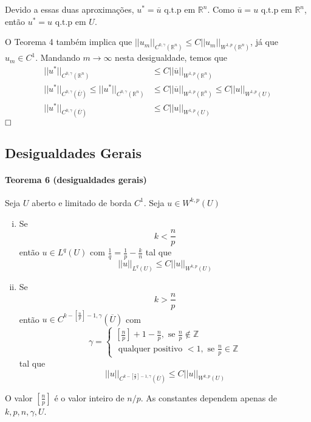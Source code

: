 \documentclass[a4paper, 11pt]{book}
\newcommand{\qed}{$\hfill\square$}
\newcommand{\Z}{\mathbb{Z}}
\newcommand{\Rn}{{\mathbb{R}^n}}
\begin{document}
Devido a essas duas aproximações, $u^* = \overline{u} \text{ q.t.p em } \Rn$.  Como $\overline{u}=u \text{ q.t.p em } \Rn$, então $u^* = u \text{ q.t.p em } U$.

O Teorema 4 também implica que $||u_m||_{C^{0,\gamma}{(\mathbb{R}^n)}} \leq C ||u_m||_{W^{1,p}{(\mathbb{R}^n)}}$, já que $u_m \in C^1$. Mandando $m \rightarrow \infty$ nesta desigualdade, temos que \begin{align*}
	 ||u^*||_{C^{0,\gamma}{(\mathbb{R}^n)}} &\leq  C ||\overline{u}||_{W^{1,p}{(\mathbb{R}^n)}}  \\
	  ||u^*||_{C^{0,\gamma}(\overline{U})}  \leq ||u^*||_{C^{0,\gamma}{(\mathbb{R}^n)}} &\leq  C ||\overline{u}||_{W^{1,p}{(\mathbb{R}^n)}} \leq C ||u||_{W^{1,p}(U)} \\
	  ||u^*||_{C^{0,\gamma}(\overline{U})}  &\leq C ||u||_{W^{1,p}(U)}
\end{align*}
\qed


\subsection{Desigualdades Gerais}

\paragraph{Teorema 6 (desigualdades gerais)} Seja $U$ aberto e limitado de borda $C^1$. Seja $u \in W^{k,p}(U)$

\begin{enumerate}[(i)]
	\item Se \[ k < \frac{n}{p} \] então \(u \in L^q(U) \) com \( \frac{1}{q} = \frac{1}{p} - \frac{k}{n}\) tal que \[ ||u||_{L^q(U)} \leq C ||u||_{W^{k,p}(U)} \]
	
	\item Se \[ k > \frac{n}{p} \] então \(u \in C^{k- \left[\frac{n}{p}\right] - 1, \gamma}(\overline{U})\) com \[ \gamma = \begin{cases}
		\left[\frac{n}{p}\right] + 1 - \frac{n}{p}, \text{ se } \frac{n}{p} \notin\Z \\
		\text{ qualquer positivo } < 1, \text{ se } \frac{n}{p} \in \Z
	\end{cases} \] tal que \[ ||u||_{C^{k- \left[\frac{n}{p}\right] - 1, \gamma}(\overline{U})} \leq C ||u||_{W^{k,p}(U)} \]
\end{enumerate}

O valor $ \left[\frac{n}{p}\right] $ é o valor inteiro de $n/p$. As constantes dependem apenas de $k,p,n,\gamma, U$.
\end{document}
